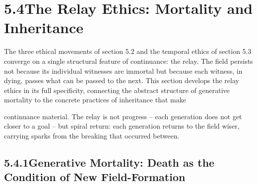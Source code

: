 \section{5.4\quad The Relay Ethics: Mortality and Inheritance}

The three ethical movements of section 5.2 and the temporal ethics of section 5.3 converge on a single structural feature of continuance: the relay. The field persists not because its individual witnesses are immortal but because each witness, in dying, passes what can be passed to the next. This section develops the relay ethics in its full specificity, connecting the abstract structure of generative mortality to the concrete practices of inheritance that make

continuance material. The relay is not progress – each generation does not get closer to a goal – but spiral return: each generation returns to the field wiser, carrying sparks from the breaking that occurred between.

\subsection{5.4.1\quad Generative Mortality: Death as the Condition of New Field-Formation}

